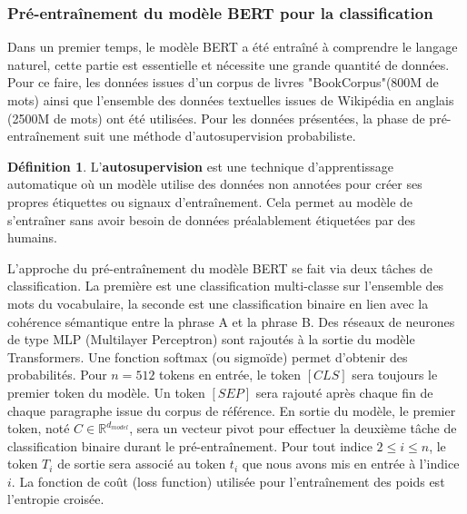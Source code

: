 \documentclass[12pt]{article}
\theoremstyle{definition}
\newtheorem{defi}{Définition}
\begin{document}
\subsubsection{Pré-entraînement du modèle BERT pour la classification}


Dans un premier temps, le modèle BERT a été entraîné à comprendre le langage naturel, cette partie est essentielle et nécessite une grande quantité de données. Pour ce faire, les données issues d’un corpus de livres "BookCorpus"(800M de mots) ainsi que l’ensemble des données textuelles issues de Wikipédia en anglais (2500M de mots) ont été utilisées. Pour les données présentées, la phase de pré-entraînement suit une méthode d'autosupervision probabiliste. \\


\begin{defi} L'\textbf{autosupervision} est une technique d'apprentissage automatique où un modèle utilise des données non annotées pour créer ses propres étiquettes ou signaux d'entraînement. Cela permet au modèle de s'entraîner sans avoir besoin de données préalablement étiquetées par des humains.\\
	
\end{defi}



L'approche du pré-entraînement du modèle BERT se fait via deux tâches de classification. La première est une classification multi-classe sur l’ensemble des mots du vocabulaire, la seconde est une classification binaire en lien avec la cohérence sémantique entre la phrase A et la phrase B. Des réseaux de neurones de type MLP (Multilayer Perceptron) sont rajoutés à la sortie du modèle Transformers. Une fonction softmax (ou sigmoïde) permet d’obtenir des probabilités. Pour $n = 512$ tokens en entrée, le token $[CLS]$ sera toujours le premier token du modèle. Un token $[SEP]$ sera rajouté après chaque fin de chaque paragraphe issue du corpus de référence. En sortie du modèle, le premier token, noté $C\in\mathbb{R}^{d_{model}}$, sera un vecteur pivot pour effectuer la deuxième tâche de classification binaire durant le pré-entraînement. Pour tout indice $2\leq i\leq n$, le token $T_i$ de sortie sera associé au token $t_i$ que nous avons mis en entrée à l'indice $i$. La fonction de coût (loss function) utilisée pour l'entraînement des poids est l'entropie croisée. 

\newpage 
\end{document}

